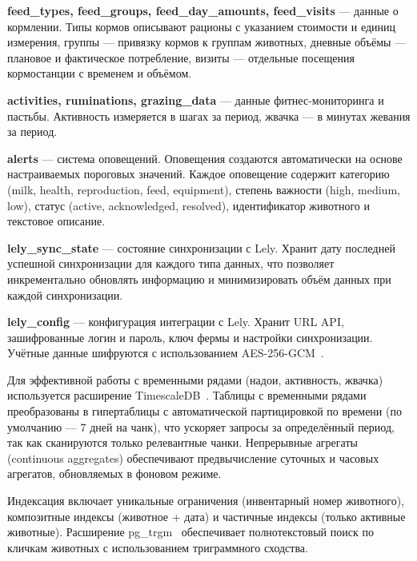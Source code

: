 \textbf{feed\_types, feed\_groups, feed\_day\_amounts, feed\_visits} --- данные о кормлении. Типы кормов описывают рационы с указанием стоимости и единиц измерения, группы --- привязку кормов к группам животных, дневные объёмы --- плановое и фактическое потребление, визиты --- отдельные посещения кормостанции с временем и объёмом.

\textbf{activities, ruminations, grazing\_data} --- данные фитнес-мониторинга и пастьбы. Активность измеряется в шагах за период, жвачка --- в минутах жевания за период.

\textbf{alerts} --- система оповещений. Оповещения создаются автоматически на основе настраиваемых пороговых значений. Каждое оповещение содержит категорию (milk, health, reproduction, feed, equipment), степень важности (high, medium, low), статус (active, acknowledged, resolved), идентификатор животного и текстовое описание.

\textbf{lely\_sync\_state} --- состояние синхронизации с Lely. Хранит дату последней успешной синхронизации для каждого типа данных, что позволяет инкрементально обновлять информацию и минимизировать объём данных при каждой синхронизации.

\textbf{lely\_config} --- конфигурация интеграции с Lely. Хранит URL API, зашифрованные логин и пароль, ключ фермы и настройки синхронизации. Учётные данные шифруются с использованием AES-256-GCM~\cite{AES-GCM}.

Для эффективной работы с временными рядами (надои, активность, жвачка) используется расширение TimescaleDB~\cite{TimescaleDB}. Таблицы с временными рядами преобразованы в гипертаблицы с автоматической партицировкой по времени (по умолчанию --- 7 дней на чанк), что ускоряет запросы за определённый период, так как сканируются только релевантные чанки. Непрерывные агрегаты (continuous aggregates) обеспечивают предвычисление суточных и часовых агрегатов, обновляемых в фоновом режиме.

Индексация включает уникальные ограничения (инвентарный номер животного), композитные индексы (животное + дата) и частичные индексы (только активные животные). Расширение pg\_trgm~\cite{PgTrgm} обеспечивает полнотекстовый поиск по кличкам животных с использованием триграммного сходства.
